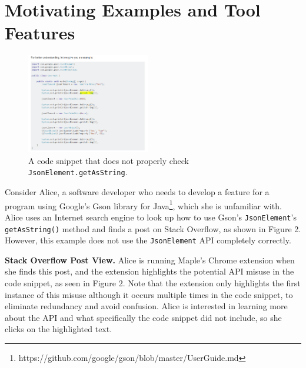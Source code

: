 \section{Motivating Examples and Tool Features}
\label{sec:motivation}
\begin{figure}
\includegraphics[width=0.48\textwidth]{json_ex1.PNG}
\vspace{.1in}
\caption{A code snippet that does not properly check {\tt JsonElement.getAsString}.\protect\footnotemark}
\label{fig:arch}
\end{figure}


Consider Alice, a software developer who needs to develop a feature for a program using Google's Gson library for Java\footnote{https://github.com/google/gson/blob/master/UserGuide.md}, which she is unfamiliar with. Alice uses an Internet search engine to look up how to use Gson's {\tt JsonElement}'s {\tt getAsString()} method and finds a post on Stack Overflow, as shown in Figure 2. However, this example does not use the {\tt JsonElement} API completely correctly. 

{\bf Stack Overflow Post View.}
Alice is running Maple's Chrome extension when she finds this post, and the extension highlights the potential API misuse in the code snippet, as seen in Figure 2. Note that the extension only highlights the first instance of this misuse although it occurs multiple times in the code snippet, to eliminate redundancy and avoid confusion. Alice is interested in learning more about the API and what specifically the code snippet did not include, so she clicks on the highlighted text.


